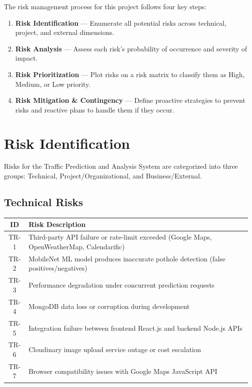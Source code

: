\documentclass[12pt,a4paper]{article}
\begin{document}
The risk management process for this project follows four key steps:
\begin{enumerate}[noitemsep, label=\roman*)]
    \item \textbf{Risk Identification} --- Enumerate all potential risks across technical, project, and external dimensions.
    \item \textbf{Risk Analysis} --- Assess each risk's probability of occurrence and severity of impact.
    \item \textbf{Risk Prioritization} --- Plot risks on a risk matrix to classify them as High, Medium, or Low priority.
    \item \textbf{Risk Mitigation \& Contingency} --- Define proactive strategies to prevent risks and reactive plans to handle them if they occur.
\end{enumerate}

\section{Risk Identification}

Risks for the Traffic Prediction and Analysis System are categorized into three groups: Technical, Project/Organizational, and Business/External.

\subsection{Technical Risks}

\begin{center}
\begin{tabular}{c l}
\toprule
\textbf{ID} & \textbf{Risk Description} \\
\midrule
TR-1 & Third-party API failure or rate-limit exceeded (Google Maps, OpenWeatherMap, Calendarific) \\
TR-2 & MobileNet ML model produces inaccurate pothole detection (false positives/negatives) \\
TR-3 & Performance degradation under concurrent prediction requests \\
TR-4 & MongoDB data loss or corruption during development \\
TR-5 & Integration failure between frontend React.js and backend Node.js APIs \\
TR-6 & Cloudinary image upload service outage or cost escalation \\
TR-7 & Browser compatibility issues with Google Maps JavaScript API \\
\bottomrule
\end{tabular}
\end{center}
\end{document}

